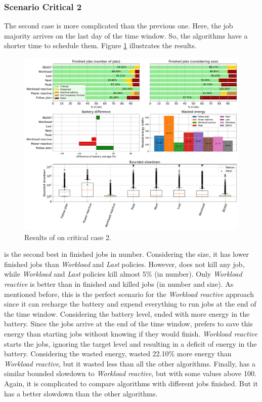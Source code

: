
\subsubsection{Scenario Critical 2}

The second case is more complicated than the previous one. Here, the job majority arrives on the last day of the time window. So, the algorithms have a shorter time to schedule them. Figure \ref{fig:beasy_critical_2} illustrates the results. 

\begin{figure}[!htb]
    \centering
    \includegraphics[scale=0.39]{Images/Heuristic/profile_best_workload_2_with_noise.pdf}
    \caption{Results of \emph{\systemName} on critical case 2.}
    \label{fig:beasy_critical_2}
\end{figure}

\emph{\systemName} is the second best in finished jobs in number. Considering the size, it has lower finished jobs than \emph{Workload} and \emph{Last} policies. However, \emph{\systemName} does not kill any job, while \emph{Workload} and \emph{Last} policies kill almost 5\% (in number). Only \emph{Workload reactive} is better than \emph{\systemName} in finished and killed jobs (in number and size). As mentioned before, this is the perfect scenario for the \emph{Workload reactive} approach since it can recharge the battery and expend everything to run jobs at the end of the time window. Considering the battery level, \emph{\systemName} ended with more energy in the battery. Since the jobs arrive at the end of the time window, \emph{\systemName} prefers to save this energy than starting jobs without knowing if they would finish. \emph{Workload reactive} starts the jobs, ignoring the target level and resulting in a deficit of energy in the battery. Considering the wasted energy, \emph{\systemName} wasted 22.10\% more energy than \emph{Workload reactive}, but it wasted less than all the other algorithms. Finally, \emph{\systemName} has a similar bounded slowdown to \emph{Workload reactive}, but with some values above 100. Again, it is complicated to compare algorithms with different jobs finished. But it has a better slowdown than the other algorithms.

